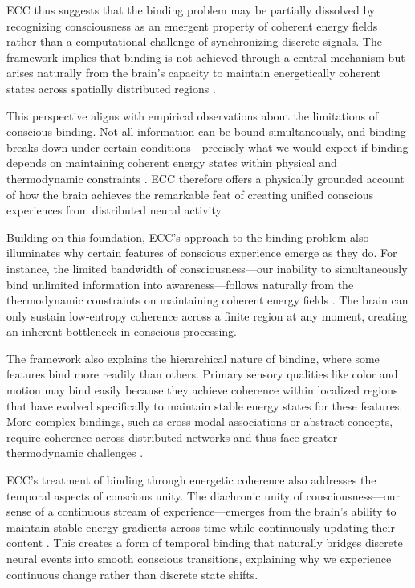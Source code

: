 ECC thus suggests that the binding problem may be partially dissolved by recognizing consciousness as an emergent property of coherent energy fields rather than a computational challenge of synchronizing discrete signals. The framework implies that binding is not achieved through a central mechanism but arises naturally from the brain's capacity to maintain energetically coherent states across spatially distributed regions \cite{lisman2013theta}.

This perspective aligns with empirical observations about the limitations of conscious binding. Not all information can be bound simultaneously, and binding breaks down under certain conditions—precisely what we would expect if binding depends on maintaining coherent energy states within physical and thermodynamic constraints \cite{zeki1999toward}. ECC therefore offers a physically grounded account of how the brain achieves the remarkable feat of creating unified conscious experiences from distributed neural activity.

Building on this foundation, ECC's approach to the binding problem also illuminates why certain features of conscious experience emerge as they do. For instance, the limited bandwidth of consciousness—our inability to simultaneously bind unlimited information into awareness—follows naturally from the thermodynamic constraints on maintaining coherent energy fields \cite{gray1999temporal}. The brain can only sustain low-entropy coherence across a finite region at any moment, creating an inherent bottleneck in conscious processing.

The framework also explains the hierarchical nature of binding, where some features bind more readily than others. Primary sensory qualities like color and motion may bind easily because they achieve coherence within localized regions that have evolved specifically to maintain stable energy states for these features. More complex bindings, such as cross-modal associations or abstract concepts, require coherence across distributed networks and thus face greater thermodynamic challenges \cite{engel2001temporal}.

ECC's treatment of binding through energetic coherence also addresses the temporal aspects of conscious unity. The diachronic unity of consciousness—our sense of a continuous stream of experience—emerges from the brain's ability to maintain stable energy gradients across time while continuously updating their content \cite{fell2011role}. This creates a form of temporal binding that naturally bridges discrete neural events into smooth conscious transitions, explaining why we experience continuous change rather than discrete state shifts.


